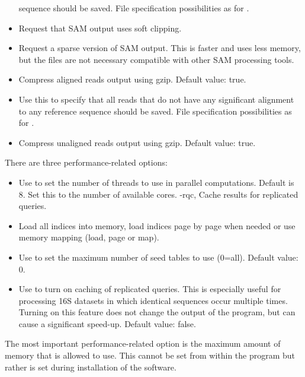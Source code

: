 \documentclass[11pt]{article}
\begin{document}
\begin{itemize}
sequence should be saved. 
File specification possibilities as for .
\item[\itt{--samSoftClip}] Request that SAM output uses soft clipping.
\item[\itt{--sparseSAM}] Request a sparse version of SAM output. This is faster and uses less memory, but the files are not necessary compatible with
other SAM processing tools.
\item[\itt{--gzipAligned}]                    Compress aligned reads output using gzip. Default value: true.
\item[\itt{--outUnaligned}]      Use this to specify that all reads that do not have any significant alignment to any reference
sequence should be saved.
File specification possibilities as for .
\item[\itt{ --gzipUnaligned}]                  Compress unaligned reads output using gzip. Default value: true.
\end{itemize}


There are three performance-related options:
\begin{itemize}
\setlength{\itemindent}{30pt}
\item[\itt{--threads}] Use to set the number of threads to use in parallel computations. Default is 8. Set this to
the number of available cores.
	-rqc,           Cache results for replicated queries. 
\item[\itt{--memoryMode}] Load all indices into memory, load indices page by page when needed or use memory mapping (load, page or map).
\item[\itt{--maxTables}] Use to set the maximum number of seed tables to use (0=all). Default value: 0.
\item[\itt{--replicateQueryCache}] Use to turn on caching of replicated queries. This is especially useful for processing 16S datasets
in which identical sequences occur multiple times. Turning on this feature does not change the output of the program, but can
cause a significant speed-up. Default value: false.
\end{itemize}
The most important performance-related option is the maximum amount of memory that 
is allowed to use. This cannot be set from within the program but rather is set during installation of the software.
\end{document}
